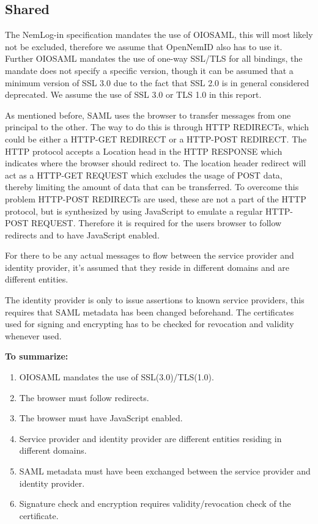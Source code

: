 \documentclass[twosided]{report}
\begin{document}
\subsection{Shared}
The NemLog-in specification mandates the use of OIOSAML, this will most likely not be excluded, therefore we assume that OpenNemID also has to use it. Further OIOSAML mandates the use of one-way SSL/TLS for all bindings, the mandate does not specify a specific version, though it can be assumed that a minimum version of SSL 3.0 due to the fact that SSL 2.0 is in general considered deprecated. We assume the use of SSL 3.0 or TLS 1.0 in this report.
\par
As mentioned before, SAML uses the browser to transfer messages from one principal to the other. The way to do this is through HTTP REDIRECTs, which could be either a HTTP-GET REDIRECT or a HTTP-POST REDIRECT. The HTTP protocol accepts a Location head in the HTTP RESPONSE which indicates where the browser should redirect to. The location header redirect will act as a HTTP-GET REQUEST which excludes the usage of POST data, thereby limiting the amount of data that can be transferred. To overcome this problem HTTP-POST REDIRECTs are used, these are not a part of the HTTP protocol, but is synthesized by using JavaScript to emulate a regular HTTP-POST REQUEST. Therefore it is required for the users browser to follow redirects and to have JavaScript enabled.
\par
For there to be any actual messages to flow between the service provider and identity provider, it's assumed that they reside in different domains and are different entities.
\par
The identity provider is only to issue assertions to known service providers, this requires that SAML metadata has been changed beforehand. The certificates used for signing and encrypting has to be checked for revocation and validity whenever used.
\\
\par
\textbf{To summarize:}
\begin{enumerate}
	\item OIOSAML mandates the use of SSL(3.0)/TLS(1.0).
	\item The browser must follow redirects.
	\item The browser must have JavaScript enabled.
	\item Service provider and identity provider are different entities residing in different domains.
	\item SAML metadata must have been exchanged between the service provider and identity provider.
	\item Signature check and encryption requires validity/revocation check of the certificate.
\end{enumerate}
\end{document}

